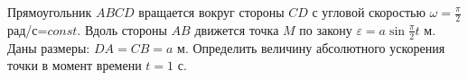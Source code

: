 Прямоугольник $ABCD$ вращается вокруг стороны $CD$ с угловой скоростью
$\omega=\frac{\pi}{2}$ рад/с=$const$. Вдоль стороны $AB$ движется точка
$M$ по закону $\varepsilon=a\sin\frac{\pi}{2} t$ м. Даны размеры:
$DA=CB=a$ м. Определить величину абсолютного ускорения точки в момент
времени $t=1$ с.
